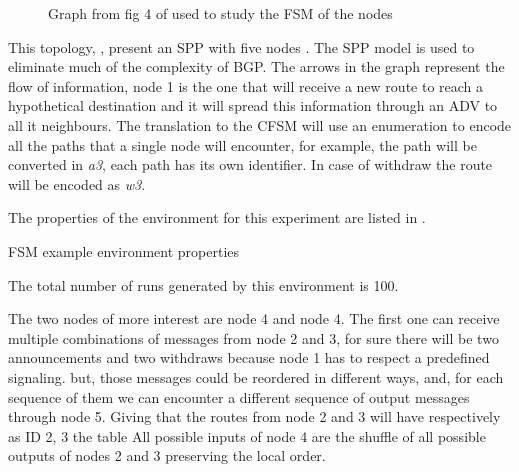 \begin{figure}[h]                                                               
    \begin{center}                                                              
        
    \end{center}                                                                
	\caption{Graph from fig 4 of \cite{griffinFSM} used to study the \ac{FSM}
		of the nodes}                                
    \label{fig:griffin_fig_4}                                                   
\end{figure}

This topology, , present an \ac{SPP} with five nodes \cite{griffin2002stable}. 
The \ac{SPP} model is used to eliminate much of the complexity of \ac{BGP}.
The arrows in the graph represent the flow of information, node \num{1} is the one
that will receive a new route to reach a hypothetical destination and it will 
spread this information through an \ac{ADV} to all it neighbours.
The translation to the \ac{CFSM} will use an enumeration to encode all the
paths that a single node will encounter, for example, the path  will
be converted in \textit{a3}, each path has its own identifier.
In case of withdraw the route will be encoded as \textit{w3}.

The properties of the environment for this experiment are listed in .

\begin{table}[h]
	
	\caption{FSM example environment properties}
	\label{tbl:fig_4_example}
\end{table}

The total number of runs generated by this environment is \num{100}.

The two nodes of more interest are node \num{4} and node \num{4}.
The first one can receive multiple combinations of messages from node \num{2} and
\num{3}, for sure there will be two announcements and two withdraws because node
1 has to respect a predefined signaling. but, those messages could be reordered
in different ways, and, for each sequence of them we can encounter a different
sequence of output messages through node \num{5}.
Giving that the routes from node \num{2} and \num{3} will have respectively as 
ID \num{2}, \num{3} the table 
All possible inputs of node \num{4} are the shuffle of all possible
outputs of nodes \num{2} and \num{3} preserving the local order.

